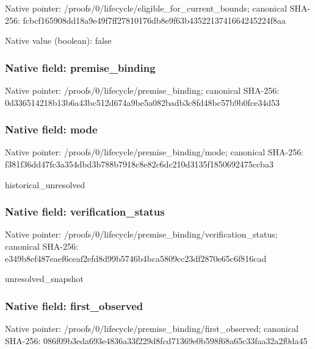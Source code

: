 \documentclass[10pt,a4paper]{article}
\begin{document}
Native pointer: /proofs/0/lifecycle/elig\allowbreak{}ible\_for\_current\_bounds; canonical SHA-256: fcbcf165908dd18a9e49f7ff\allowbreak{}27810176db8e9f63b4352213\allowbreak{}741664245224f8aa



Native value (boolean): false



\subsubsection{Native field: premise\_binding}


Native pointer: /proofs/0/lifecycle/premise\_binding; canonical SHA-256: 0d336514218b13b6a43bc512\allowbreak{}d674a9be5a082badb3c8fd48\allowbreak{}bc57b9b0fce34d53



\subsubsection{Native field: mode}


Native pointer: /proofs/0/lifecycle/prem\allowbreak{}ise\_binding/mode; canonical SHA-256: f381f36dd47fc3a354dbd3b7\allowbreak{}88b7918c8e82c6dc210d3135\allowbreak{}f1850692475ccba3


historical\_unresolved


\subsubsection{Native field: verification\_status}


Native pointer: /proofs/0/lifecycle/prem\allowbreak{}ise\_binding/verification\allowbreak{}\_status; canonical SHA-256: e349b8ef487eaef6ceaf2efd\allowbreak{}8d99b5746b4bca5809cc23df\allowbreak{}2870e65c6f816cad


unresolved\_snapshot


\subsubsection{Native field: first\_observed}


Native pointer: /proofs/0/lifecycle/prem\allowbreak{}ise\_binding/first\_observ\allowbreak{}ed; canonical SHA-256: 086f09b3eda693e4836a33f2\allowbreak{}29d8fcd71369e0b598f68a65\allowbreak{}c33faa32a2f0da45
\end{document}
